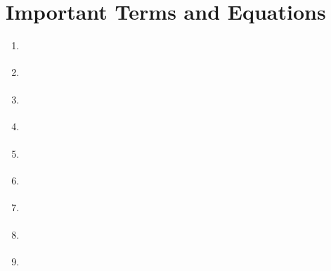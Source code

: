 \documentclass[letterpaper,10pt,english]{sphinxmanual}
\begin{document}
\section{Important Terms and Equations}
\label{\detokenize{Review/Review_Fluid_Mechanics:important-terms-and-equations}}\label{\detokenize{Review/Review_Fluid_Mechanics:heading-fluids-terms-eqs}}
\begin{enumerate}
\item {} 
{\hyperref[\detokenize{Review/Review_Fluid_Mechanics:heading-laminar-and-turbulent-flow}]{}}

\item {} 
{\hyperref[\detokenize{Review/Review_Fluid_Mechanics:heading-laminar-and-turbulent-flow}]{}}

\item {} 
{\hyperref[\detokenize{Review/Review_Fluid_Mechanics:heading-laminar-and-turbulent-flow}]{}}

\item {} 
{\hyperref[\detokenize{Review/Review_Fluid_Mechanics:heading-streamlines-and-control-volumes}]{}}

\item {} 
{\hyperref[\detokenize{Review/Review_Fluid_Mechanics:heading-streamlines-and-control-volumes}]{}}

\item {} 
{\hyperref[\detokenize{Review/Review_Fluid_Mechanics:heading-bernoulli-equation}]{}}

\item {} 
{\hyperref[\detokenize{Review/Review_Fluid_Mechanics:heading-head-loss}]{}}

\item {} 
{\hyperref[\detokenize{Review/Review_Fluid_Mechanics:heading-head-loss-elevation-difference-trick}]{}}

\item {} 
{\hyperref[\detokenize{Review/Review_Fluid_Mechanics:heading-what-is-a-vena-contracta}]{}}

\end{enumerate}
\end{document}

